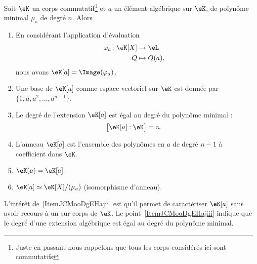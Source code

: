 \begin{proposition}   \label{PropURZooVtwNXE}
    Soit \( \eK\) un corps commutatif\footnote{Juste en passant nous rappelons que tous les corps considérés ici sont commutatifs} et \( a\) un élément algébrique sur \( \eK\), de polynôme minimal \( \mu_a\) de degré \( n\). Alors
    \begin{enumerate}
        \item\label{ItemJCMooDgEHajmi}
            En considérant l'application d'évaluation
            \begin{equation}
                \begin{aligned}
                    \varphi_a\colon \eK[X]&\to \eL \\
                    Q&\mapsto Q(a),
                \end{aligned}
            \end{equation}
            nous avons \( \eK[a]=\Image(\varphi_a)\).
        \item\label{ItemJCMooDgEHajiv}
            Une base de \( \eK[a]\) comme espace vectoriel sur \( \eK\) est donnée par \( \{ 1,a,a^2,\ldots, a^{n-1} \}\).
        \item\label{ItemJCMooDgEHajiii}
            Le degré de l'extension \( \eK[a]\) est égal au degré du polynôme minimal :
            \begin{equation}
                \big[ \eK[a]:\eK \big]=n.
            \end{equation}
         \item
            L'anneau \( \eK[a]\) est l'ensemble des polynômes en \( a\) de degré \( n-1\) à coefficient dans \( \eK\).
        \item\label{ItemJCMooDgEHaji}
            \( \eK(a)=\eK[a]\).
        \item   \label{ItemJCMooDgEHajii}
            \( \eK[a]\simeq\eK[X]/(\mu_a)\) (isomorphisme d'anneau).
    \end{enumerate}
\end{proposition}
L'intérêt de~\ref{ItemJCMooDgEHajii} est qu'il permet de caractériser \( \eK[a]\) sans avoir recours à un sur-corps de \( \eK\). Le point~\ref{ItemJCMooDgEHajiii} indique que le degré d'une extension algébrique est égal au degré du polynôme minimal.

